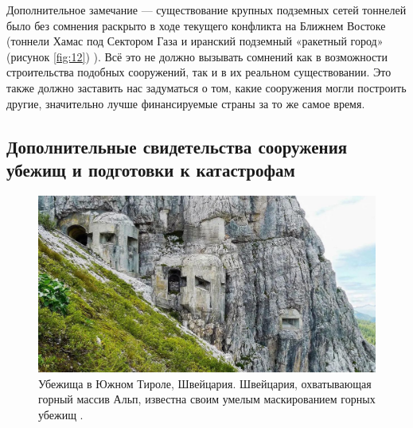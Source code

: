 \documentclass[10pt,twocolumn,letterpaper]{article}
\begin{document}
Дополнительное замечание — существование крупных подземных сетей тоннелей было без сомнения раскрыто в ходе текущего конфликта на Ближнем Востоке (тоннели Хамас под Сектором Газа \cite{38} и иранский подземный «ракетный город» (рисунок \ref{fig:12}) \cite{39,40}). Всё это не должно вызывать сомнений как в возможности строительства подобных сооружений, так и в их реальном существовании. Это также должно заставить нас задуматься о том, какие сооружения могли построить другие, значительно лучше финансируемые страны за то же самое время.

\subsection{Дополнительные свидетельства сооружения убежищ и подготовки к катастрофам}

\begin{figure}[t]
\begin{center}
   \includegraphics[width=1\linewidth]{tyrol.jpg}
\end{center}
   \caption{Убежища в Южном Тироле, Швейцария. Швейцария, охватывающая горный массив Альп, известна своим умелым маскированием горных убежищ \cite{32}.}
\label{fig:7}
\label{fig:onecol}
\end{figure}
\end{document}
